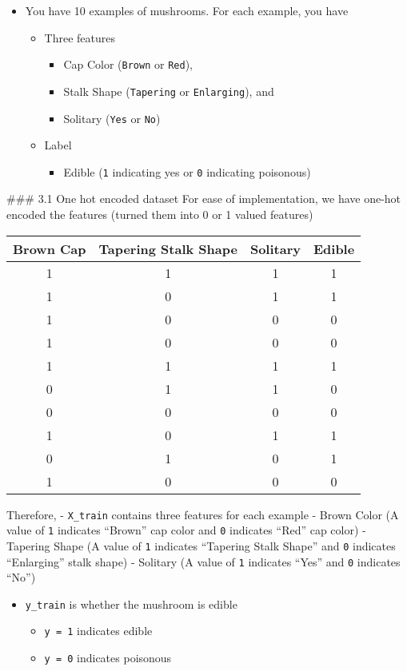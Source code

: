 \documentclass[11pt]{article}
\providecommand{\tightlist}{%
      \setlength{\itemsep}{0pt}\setlength{\parskip}{0pt}}
\begin{document}
\begin{itemize}
\tightlist
\item
  You have 10 examples of mushrooms. For each example, you have

  \begin{itemize}
  \tightlist
  \item
    Three features

    \begin{itemize}
    \tightlist
    \item
      Cap Color (\texttt{Brown} or \texttt{Red}),
    \item
      Stalk Shape (\texttt{Tapering} or \texttt{Enlarging}), and
    \item
      Solitary (\texttt{Yes} or \texttt{No})
    \end{itemize}
  \item
    Label

    \begin{itemize}
    \tightlist
    \item
      Edible (\texttt{1} indicating yes or \texttt{0} indicating
      poisonous)
    \end{itemize}
  \end{itemize}
\end{itemize}

\#\#\# 3.1 One hot encoded dataset For ease of implementation, we have
one-hot encoded the features (turned them into 0 or 1 valued features)

\begin{longtable}[]{@{}cccc@{}}
\toprule
Brown Cap & Tapering Stalk Shape & Solitary & Edible\tabularnewline
\midrule
\endhead
1 & 1 & 1 & 1\tabularnewline
1 & 0 & 1 & 1\tabularnewline
1 & 0 & 0 & 0\tabularnewline
1 & 0 & 0 & 0\tabularnewline
1 & 1 & 1 & 1\tabularnewline
0 & 1 & 1 & 0\tabularnewline
0 & 0 & 0 & 0\tabularnewline
1 & 0 & 1 & 1\tabularnewline
0 & 1 & 0 & 1\tabularnewline
1 & 0 & 0 & 0\tabularnewline
\bottomrule
\end{longtable}

Therefore, - \texttt{X\_train} contains three features for each example
- Brown Color (A value of \texttt{1} indicates ``Brown'' cap color and
\texttt{0} indicates ``Red'' cap color) - Tapering Shape (A value of
\texttt{1} indicates ``Tapering Stalk Shape'' and \texttt{0} indicates
``Enlarging'' stalk shape) - Solitary (A value of \texttt{1} indicates
``Yes'' and \texttt{0} indicates ``No'')

\begin{itemize}
\tightlist
\item
  \texttt{y\_train} is whether the mushroom is edible

  \begin{itemize}
  \tightlist
  \item
    \texttt{y\ =\ 1} indicates edible
  \item
    \texttt{y\ =\ 0} indicates poisonous
  \end{itemize}
\end{itemize}
\end{document}
